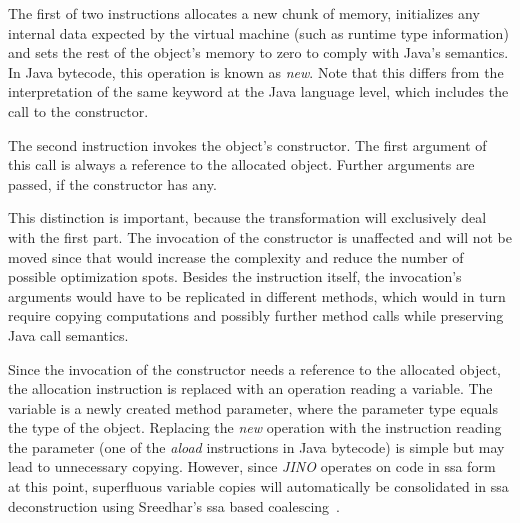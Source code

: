 
			The first of two instructions allocates a new chunk of memory, initializes any internal data expected by the
			virtual machine (such as runtime type information) and sets the rest of the object's memory to zero to comply with
			Java's semantics. In Java bytecode, this operation is known as \emph{new}. Note that this differs from the
			interpretation of the same keyword at the Java language level, which includes the call to the constructor.

			The second instruction invokes the object's constructor. The first argument of this call is always a reference to
			the allocated object. Further arguments are passed, if the constructor has any.

			This distinction is important, because the transformation will exclusively deal with the first part. The
			invocation of the constructor is unaffected and will not be moved since that would increase the complexity and
			reduce the number of possible optimization spots. Besides the instruction itself, the invocation's arguments would
			have to be replicated in different methods, which would in turn require copying computations and possibly further
			method calls while preserving Java call semantics.

			Since the invocation of the constructor needs a reference to the allocated object, the allocation instruction is
			replaced with an operation reading a variable. The variable is a newly created method parameter, where the
			parameter type equals the type of the object. Replacing the \emph{new} operation with the instruction reading the
			parameter (one of the \emph{aload} instructions in Java bytecode) is simple but may lead to unnecessary copying.
			However, since \emph{JINO} operates on code in \gls{ssa} form at this point, superfluous variable copies will
			automatically be consolidated in \gls{ssa} deconstruction using Sreedhar's \gls{ssa} based
			coalescing~\cite{sreedhar:99:sas}.

